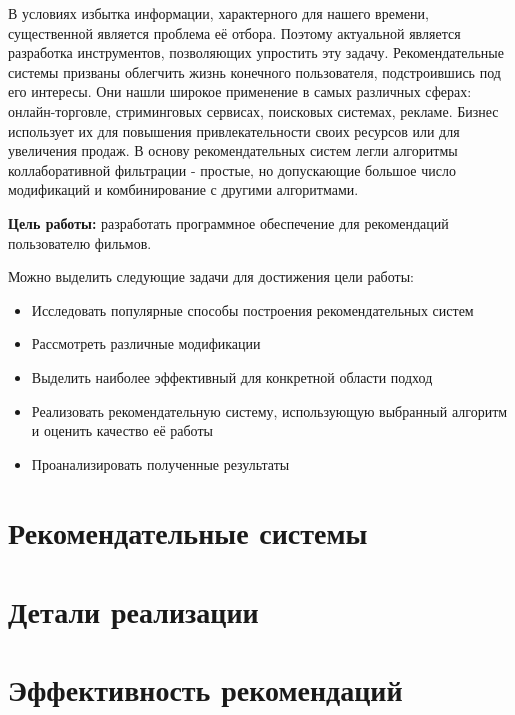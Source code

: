 \documentclass[a4paper,article,14pt]{extarticle}
\begin{document}


\tableofcontents
\pagebreak


В условиях избытка информации, характерного для нашего времени, существенной является проблема её отбора.
Поэтому актуальной является разработка инструментов, позволяющих упростить эту задачу.
Рекомендательные системы призваны облегчить жизнь конечного пользователя, подстроившись под его интересы.
Они нашли широкое применение в самых различных сферах: онлайн-торговле, стриминговых сервисах, поисковых системах, рекламе.
Бизнес использует их для повышения привлекательности своих ресурсов или для увеличения продаж.
В основу рекомендательных систем легли алгоритмы коллаборативной фильтрации - простые, но допускающие большое число модификаций и комбинирование с другими алгоритмами.


\textbf{Цель работы:} разработать программное обеспечение для рекомендаций пользователю фильмов.

Можно выделить следующие задачи для достижения цели работы:
\begin{itemize}
\item Исследовать популярные способы построения рекомендательных систем
\item Рассмотреть различные модификации
\item Выделить наиболее эффективный для конкретной области подход
\item Реализовать рекомендательную систему, использующую выбранный алгоритм и оценить качество её работы
\item Проанализировать полученные результаты

\end{itemize}
\pagebreak
\section{Рекомендательные системы}\label{sec:recommender_systems}


\pagebreak
\section{Детали реализации}\label{sec:program_realization}


\pagebreak
\section{Эффективность рекомендаций}\label{sec:algos_efficiency}

\end{document}
